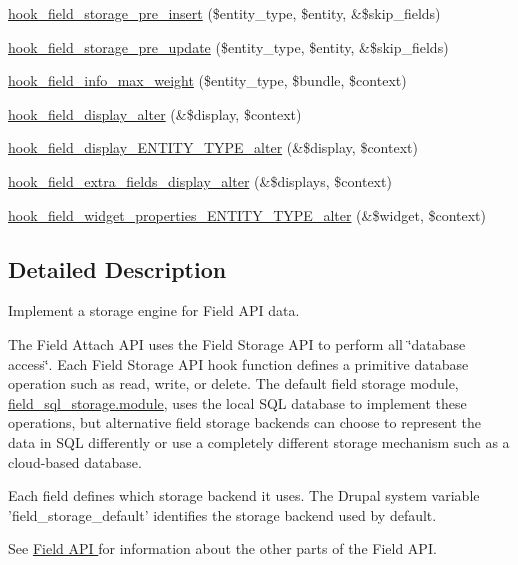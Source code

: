 \begin{DoxyCompactItemize}
\item 
\hyperlink{group__field__storage_gaa4fa274b87c435d41fc9267adedbec79}{hook\_\-field\_\-storage\_\-pre\_\-insert} (\$entity\_\-type, \$entity, \&\$skip\_\-fields)
\item 
\hyperlink{group__field__storage_ga3cc35769d019ea0dcfedc7ca6b084983}{hook\_\-field\_\-storage\_\-pre\_\-update} (\$entity\_\-type, \$entity, \&\$skip\_\-fields)
\item 
\hyperlink{group__field__storage_gaf1424a5701b90d6e40e505370ba707ce}{hook\_\-field\_\-info\_\-max\_\-weight} (\$entity\_\-type, \$bundle, \$context)
\item 
\hyperlink{group__field__storage_ga7a5d4e018902a0072d5de819bbc7c409}{hook\_\-field\_\-display\_\-alter} (\&\$display, \$context)
\item 
\hyperlink{group__field__storage_gadc76e94183dbbeebe237c70be5ca1e96}{hook\_\-field\_\-display\_\-ENTITY\_\-TYPE\_\-alter} (\&\$display, \$context)
\item 
\hyperlink{group__field__storage_ga351523fbe5df740a16257a35f2daa335}{hook\_\-field\_\-extra\_\-fields\_\-display\_\-alter} (\&\$displays, \$context)
\item 
\hyperlink{group__field__storage_gafbf6029d00ade9df41649d247531f3ba}{hook\_\-field\_\-widget\_\-properties\_\-ENTITY\_\-TYPE\_\-alter} (\&\$widget, \$context)
\end{DoxyCompactItemize}


\subsection{Detailed Description}
Implement a storage engine for Field API data.

The Field Attach API uses the Field Storage API to perform all \char`\"{}database
 access\char`\"{}. Each Field Storage API hook function defines a primitive database operation such as read, write, or delete. The default field storage module, \hyperlink{field__sql__storage_8module}{field\_\-sql\_\-storage.module}, uses the local SQL database to implement these operations, but alternative field storage backends can choose to represent the data in SQL differently or use a completely different storage mechanism such as a cloud-\/based database.

Each field defines which storage backend it uses. The Drupal system variable 'field\_\-storage\_\-default' identifies the storage backend used by default.

See \hyperlink{group__field}{Field API } for information about the other parts of the Field API.

